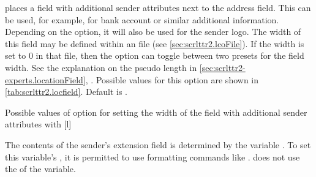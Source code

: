 \begin{Declaration}
\end{Declaration}
%
%
 places a field with additional sender attributes next to the
address field. This can be used, for example, for bank account
or similar additional information.
Depending on the
 option, it will also be used for the sender
logo. The width of this field may be defined within an  file
(see \autoref{sec:scrlttr2.lcoFile}). If the width is set to 0 in that file,
then the  option can toggle between two presets for
the field width. See the explanation on the  pseudo
length in \autoref{sec:scrlttr2-experts.locationField},
. Possible values for this
option are shown in \autoref{tab:scrlttr2.locfield}. Default is
.%
%
\begin{table}
  \setcapindent{0pt}%
  \begin{captionbeside}
    {Possible values of option  for
      setting the width of the field with additional sender attributes with
      \label{tab:scrlttr2.locfield}}%
    [l]
    \begin{minipage}[t]{.45\linewidth}
      \begin{desctabular}[t]
      \end{desctabular}
    \end{minipage}
  \end{captionbeside}
\end{table}

\begin{Declaration}
\end{Declaration}
%
The contents of the sender's extension field is determined by the
variable . To set this variable's , it is
permitted to use formatting commands like . \KOMAScript{}
does not use the  of the variable.

